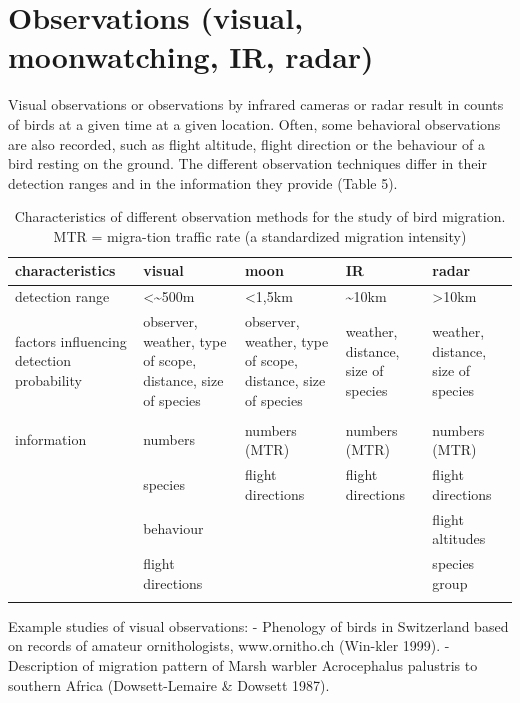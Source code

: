 \documentclass[
]{book}
\begin{document}
\hypertarget{observations-visual-moonwatching-ir-radar}{%
\section{Observations (visual, moonwatching, IR, radar)}\label{observations-visual-moonwatching-ir-radar}}

Visual observations or observations by infrared cameras or radar result in counts of birds at a given time at a given location. Often, some behavioral observations are also recorded, such as flight altitude, flight direction or the behaviour of a bird resting on the ground. The different observation techniques differ in their detection ranges and in the information they provide (Table 5).

\begin{table}

\caption{\label{tab:nice-tab}Characteristics of different observation methods for the study of bird migration. MTR = migra-tion traffic rate (a standardized migration intensity)}
\centering
\begin{tabular}[t]{lllll}
\toprule
characteristics & visual & moon & IR & radar\\
\midrule
detection range & <\textasciitilde{}500m & <1,5km & \textasciitilde{}10km & >10km\\
factors influencing detection probability & observer, weather, type of scope, distance, size of species & observer, weather, type of scope, distance, size of species & weather, distance, size of species & weather, distance, size of species\\
 &  &  &  & \\
information & numbers & numbers (MTR) & numbers (MTR) & numbers (MTR)\\
 & species & flight directions & flight directions & flight directions\\
\addlinespace
 & behaviour &  &  & flight altitudes\\
 & flight directions &  &  & species group\\
 &  &  &  & \\
\bottomrule
\end{tabular}
\end{table}

Example studies of visual observations:
- Phenology of birds in Switzerland based on records of amateur ornithologists, www.ornitho.ch (Win-kler 1999).
- Description of migration pattern of Marsh warbler Acrocephalus palustris to southern Africa (Dowsett-Lemaire \& Dowsett 1987).
\end{document}
